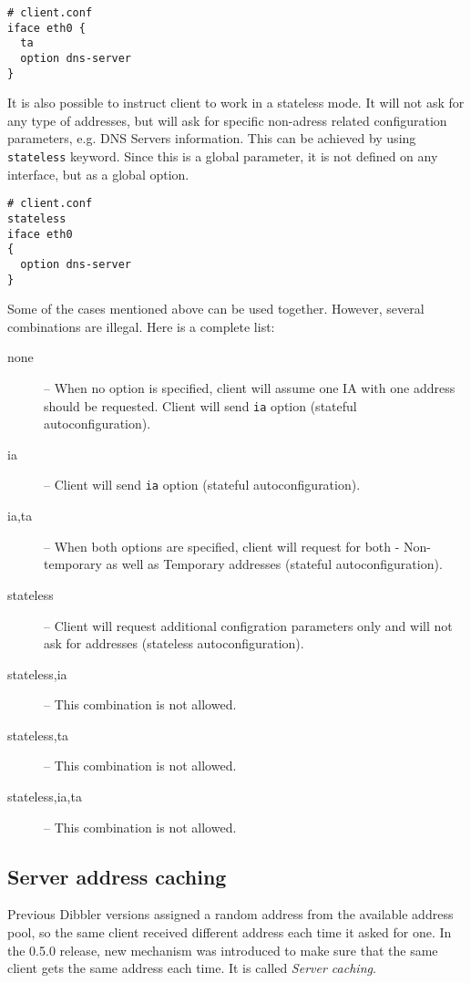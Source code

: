 \begin{enumerate}
\begin{lstlisting}
# client.conf
iface eth0 {
  ta
  option dns-server
}
\end{lstlisting}

It is also possible to instruct client to work in a stateless mode. It
will not ask for any type of addresses, but will ask for specific
non-adress related configuration parameters, e.g. DNS Servers
information. This can be achieved by using \verb+stateless+
keyword. Since this is a global parameter, it is not defined on any
interface, but as a global option.

\begin{lstlisting}
# client.conf
stateless
iface eth0
{
  option dns-server
}
\end{lstlisting}

Some of the cases mentioned above can be used together. However,
several combinations are illegal. Here is a complete list:

\begin{description}
\item[none] -- When no option is specified, client will assume one IA
  with one address should be requested. Client will send \verb+ia+
  option (stateful autoconfiguration).
\item[ia] -- Client will send \verb+ia+ option (stateful
  autoconfiguration).
\item[ia,ta] -- When both options are specified, client will request
  for both - Non-temporary as well as Temporary addresses (stateful
  autoconfiguration).
\item[stateless] -- Client will request additional configration
  parameters only and will not ask for addresses (stateless
  autoconfiguration).
\item[stateless,ia] -- This combination is not allowed.
\item[stateless,ta] -- This combination is not allowed.
\item[stateless,ia,ta] -- This combination is not allowed.
\end{description}

\subsection{Server address caching}
Previous Dibbler versions assigned a random address from the available
address pool, so the same client received different address each time it
asked for one. In the 0.5.0 release, new mechanism was introduced
to make sure that the same client gets the same address each time. It is
called \emph{Server caching}.


\end{enumerate}
